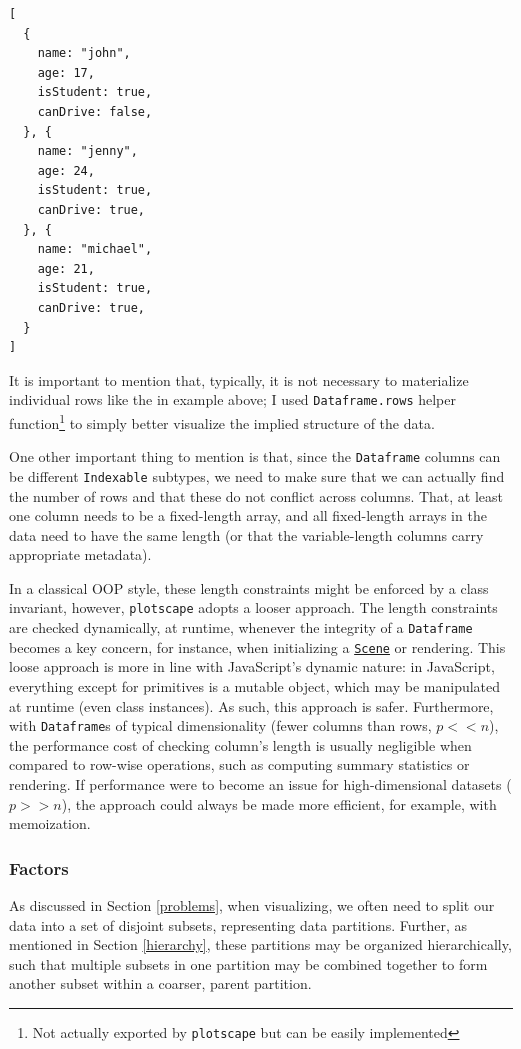 \documentclass[
  openany]{book}
\theoremstyle{definition}
\theoremstyle{definition}
\theoremstyle{definition}
\theoremstyle{definition}
\theoremstyle{remark}
\begin{document}
\begin{verbatim}
[
  {
    name: "john",
    age: 17,
    isStudent: true,
    canDrive: false,
  }, {
    name: "jenny",
    age: 24,
    isStudent: true,
    canDrive: true,
  }, {
    name: "michael",
    age: 21,
    isStudent: true,
    canDrive: true,
  }
]
\end{verbatim}

It is important to mention that, typically, it is not necessary to materialize individual rows like the in example above; I used \texttt{Dataframe.rows} helper function\footnote{Not actually exported by \texttt{plotscape} but can be easily implemented} to simply better visualize the implied structure of the data.

One other important thing to mention is that, since the \texttt{Dataframe} columns can be different \texttt{Indexable} subtypes, we need to make sure that we can actually find the number of rows and that these do not conflict across columns. That, at least one column needs to be a fixed-length array, and all fixed-length arrays in the data need to have the same length (or that the variable-length columns carry appropriate metadata).

In a classical OOP style, these length constraints might be enforced by a class invariant, however, \texttt{plotscape} adopts a looser approach. The length constraints are checked dynamically, at runtime, whenever the integrity of a \texttt{Dataframe} becomes a key concern, for instance, when initializing a \hyperref[scene]{\texttt{Scene}} or rendering. This loose approach is more in line with JavaScript's dynamic nature: in JavaScript, everything except for primitives is a mutable object, which may be manipulated at runtime (even class instances). As such, this approach is safer. Furthermore, with \texttt{Dataframe}s of typical dimensionality (fewer columns than rows, \(p << n\)), the performance cost of checking column's length is usually negligible when compared to row-wise operations, such as computing summary statistics or rendering. If performance were to become an issue for high-dimensional datasets (\(p >> n\)), the approach could always be made more efficient, for example, with memoization.

\subsubsection{Factors}\label{factors}

As discussed in Section \ref{problems}, when visualizing, we often need to split our data into a set of disjoint subsets, representing data partitions. Further, as mentioned in Section \ref{hierarchy}, these partitions may be organized hierarchically, such that multiple subsets in one partition may be combined together to form another subset within a coarser, parent partition.
\end{document}
